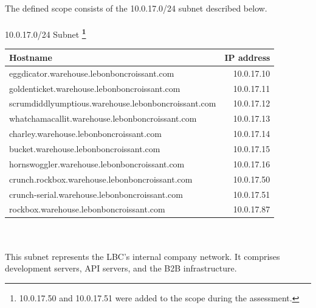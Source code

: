 \documentclass{article}
\begin{document}
The defined scope consists of the 10.0.17.0/24 subnet described below. 
\\
\\
{\Large10.0.17.0/24 Subnet \textbf{\footnote{10.0.17.50 and 10.0.17.51 were added to the scope during the assessment.}}}
\begin{table}[h]
	\centering
	{\large
		\begin{tabular}{|l|r|}
			\rowcolor{lightgray}
			\hline Hostname                                            & IP address \\
			\hline eggdicator.warehouse.lebonboncroissant.com          & 10.0.17.10 \\
			\hline goldenticket.warehouse.lebonboncroissant.com        & 10.0.17.11 \\
			\hline scrumdiddlyumptious.warehouse.lebonboncroissant.com & 10.0.17.12 \\
			\hline whatchamacallit.warehouse.lebonboncroissant.com     & 10.0.17.13 \\
			\hline charley.warehouse.lebonboncroissant.com             & 10.0.17.14 \\
			\hline bucket.warehouse.lebonboncroissant.com              & 10.0.17.15 \\
			\hline hornswoggler.warehouse.lebonboncroissant.com        & 10.0.17.16 \\
			\hline crunch.rockbox.warehouse.lebonboncroissant.com      & 10.0.17.50 \\
			\hline crunch-serial.warehouse.lebonboncroissant.com       & 10.0.17.51 \\
			\hline rockbox.warehouse.lebonboncroissant.com             & 10.0.17.87 \\
			\hline 
		\end{tabular}}
\end{table}
\\
\\
This subnet represents the LBC's internal company network. It comprises development servers, API servers, and the B2B infrastructure. 
\newpage
\newpage
\end{document}
